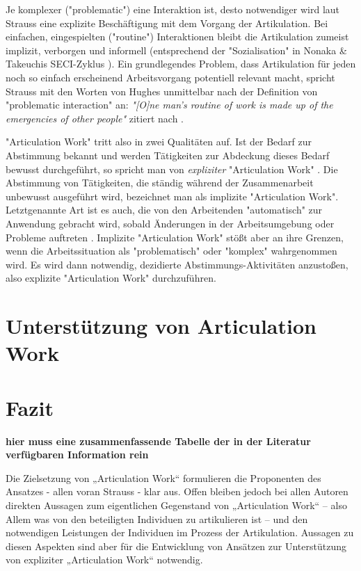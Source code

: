 Je komplexer ("problematic") eine Interaktion ist, desto notwendiger wird laut Strauss eine explizite Beschäftigung mit dem Vorgang der Artikulation. Bei einfachen, eingespielten ("routine") Interaktionen bleibt die Artikulation zumeist implizit, verborgen und informell \citep{Hampson05} (entsprechend der "Sozialisation" in Nonaka \& Takeuchis SECI-Zyklus \citep{Nonaka95}). Ein grundlegendes Problem, dass Artikulation für jeden noch so einfach erscheinend Arbeitsvorgang potentiell relevant macht, spricht Strauss mit den Worten von Hughes unmittelbar nach der Definition von "problematic interaction" an: \emph{"[O]ne man's routine of work is made up of the emergencies of other people"} \citep{Hughes71} zitiert nach \citep{Strauss93}.

"Articulation Work" tritt also in zwei Qualitäten auf. Ist der Bedarf zur Abstimmung bekannt und werden Tätigkeiten zur Abdeckung dieses Bedarf bewusst durchgeführt, so spricht man von \emph{expliziter} "Articulation Work" \citep{Strauss88}\citep{Fjuk97}. Die Abstimmung von Tätigkeiten, die ständig während der Zusammenarbeit unbewusst ausgeführt wird, bezeichnet man als implizite "Articulation Work". Letztgenannte Art ist es auch, die von den Arbeitenden "automatisch" zur Anwendung gebracht wird, sobald Änderungen in der Arbeitsumgebung oder Probleme auftreten \citep{Strauss88}. Implizite "Articulation Work" stößt aber an ihre Grenzen, wenn die Arbeitssituation als "problematisch" \citep{Strauss88} oder "komplex" \citep[][S. 23f]{Schmidt90} wahrgenommen wird. Es wird dann notwendig, dezidierte Abstimmungs-Aktivitäten anzustoßen, also explizite "Articulation Work" durchzuführen.

\section{Unterstützung von Articulation Work} %
\label{sec:unterstützung_von_articulation_work}


\section{Fazit} %
\label{sec:fazit}

\textbf{hier muss eine zusammenfassende Tabelle der in der Literatur verfügbaren Information rein}

Die Zielsetzung von „Articulation Work“ formulieren die Proponenten des Ansatzes - allen voran Strauss - klar aus. Offen bleiben jedoch bei allen Autoren direkten Aussagen zum eigentlichen Gegenstand von „Articulation Work“ – also Allem was von den beteiligten Individuen zu artikulieren ist – und den notwendigen Leistungen der Individuen im Prozess der Artikulation. Aussagen zu diesen Aspekten sind aber für die Entwicklung von Ansätzen zur Unterstützung von expliziter „Articulation Work“ notwendig. 

